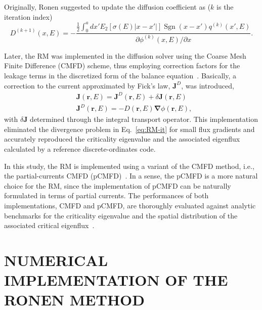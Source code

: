 \documentclass[letterpaper]{mc2021}
\newcommand{\rr}{\bm{r}}
\newcommand{\rE}{\ensuremath{(\rr,E)}}
\newcommand{\bnabla}{\ensuremath{\bm{\nabla}}}
\begin{document}
\vspace{-1.5mm}

Originally, Ronen suggested to update the diffusion coefficient as ($k$ is the iteration index)~\cite{Ronen-2004}
\begin{equation}
\label{eq:RM-it}
  D^{(k+1)}(x,E) = -\frac{\displaystyle
    \frac{1}{2}\int_0^a dx' E_2[\sigma(E)
       \lvert x-x'\rvert] \operatorname{Sgn}(x-x')q^{(k)}(x',E)}
	{\partial \phi^{(k)}(x,E)/\partial x}.
\end{equation}

\vspace{-10.5mm}

Later, the RM was implemented in the diffusion solver using the Coarse Mesh Finite Difference (CMFD) scheme, thus employing correction factors for the leakage terms in the discretized form of the balance equation~\cite{Tomatis-2011,Gross-2020}. Basically, a correction to the current approximated by Fick's law, $\bm{J}^D$, was introduced,
\begin{align}
\label{eq:Fick}
& \bm{J}\rE = \bm{J}^D\rE + \delta\bm{J}\rE \\ 
& \bm{J}^D\rE = -D\rE\bnabla\phi\rE,
\end{align}
with $\delta\bm{J}$ determined through the integral transport operator.  This implementation eliminated the divergence problem in Eq.~\eqref{eq:RM-it} for small flux gradients and accurately reproduced the criticality eigenvalue and the associated eigenflux calculated by a reference discrete-ordinates code.

\vspace{-1.5mm}

In this study, the RM is implemented using a variant of the CMFD method, i.e., the partial-currents CMFD (pCMFD)~\cite{Cho-2003}. In a sense, the pCMFD is a more natural choice for the RM, since the implementation of pCMFD can be naturally formulated in terms of partial currents. The performances of both implementations, CMFD and pCMFD, are thoroughly evaluated against analytic benchmarks for the criticality eigenvalue and the spatial distribution of the associated critical eigenflux~\cite{Sood2003}.    

\section{NUMERICAL IMPLEMENTATION OF THE RONEN METHOD} 
\label{sec:num-imp}
\end{document}
